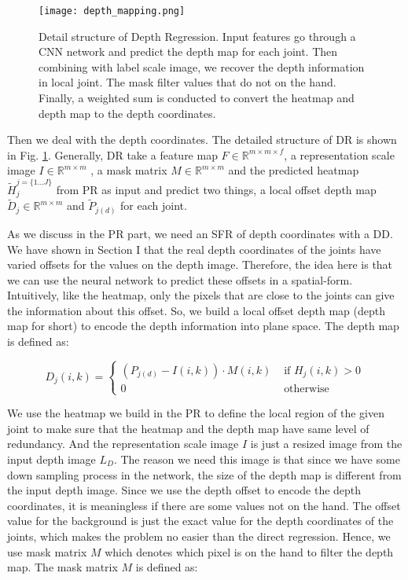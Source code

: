 \documentclass[journal]{IEEEtran}
\begin{document}
\begin{figure}[!t]
  \centering
  \texttt{[image: depth\_mapping.png]}
  \caption{Detail structure of Depth Regression. 
  Input features go through a CNN network and predict the depth map for each joint. 
  Then combining with label scale image, we recover the depth information in local joint. 
  The mask filter values that do not on the hand. 
  Finally, a weighted sum is conducted to convert the heatmap and depth map to the depth coordinates.
  }
  \label{DR}
\end{figure}

Then we deal with the depth coordinates. 
The detailed structure of DR is shown in Fig\@. \ref{DR}. 
Generally, DR take a feature map $F \in \mathbb{R}^{m \times m \times f}$, 
a representation scale image $I \in \mathbb{R}^{m \times m}$ , 
a mask matrix $M \in \mathbb{R}^{m \times m}$ and the predicted heatmap $\tilde{H}_{j}^{j=\{1 \ldots J\}}$ from PR as input and predict two things, 
a local offset depth map $\tilde{D}_{j} \in \mathbb{R}^{m \times m}$ and $\tilde{P}_{j(d)}$ for each joint. 

As we discuss in the PR part, we need an SFR of depth coordinates with a DD. 
We have shown in Section I that the real depth coordinates of the joints have varied offsets for the values on the depth image. 
Therefore, the idea here is that we can use the neural network to predict these offsets in a spatial-form. 
Intuitively, like the heatmap, only the pixels that are close to the joints can give the information about this offset. 
So, we build a local offset depth map (depth map for short) to encode the depth information into plane space. 
The depth map is defined as:

\begin{equation}
  D_{j}(i, k)=\left\{\begin{array}{ll}{\left(P_{j(d)}-I(i, k)\right) \cdot M(i, k)} & {\text { if } H_{j}(i, k)>0} \\ {0} & {\text { otherwise }}\end{array}\right.
\end{equation}

We use the heatmap we build in the PR to define the local region of the given joint to make sure that the heatmap and the depth map have same level of redundancy. 
And the representation scale image $I$ is just a resized image from the input depth image $L_{D}$. 
The reason we need this image is that since we have some down sampling process in the network, the size of the depth map is different from the input depth image. 
Since we use the depth offset to encode the depth coordinates, it is meaningless if there are some values not on the hand. 
The offset value for the background is just the exact value for the depth coordinates of the joints, which makes the problem no easier than the direct regression. 
Hence, we use mask matrix $M$ which denotes which pixel is on the hand to filter the depth map. 
The mask matrix $M$ is defined as:
\end{document}
